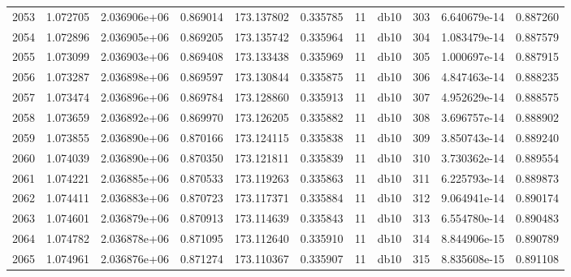 \begin{tabular}{lrrrrrrlrrr}
2053 &    1.072705 &        2.036906e+06 &  0.869014 &              173.137802 &    0.335785 &      11 &         db10 &    303 &   6.640679e-14 &      0.887260 \\
2054 &    1.072896 &        2.036905e+06 &  0.869205 &              173.135742 &    0.335964 &      11 &         db10 &    304 &   1.083479e-14 &      0.887579 \\
2055 &    1.073099 &        2.036903e+06 &  0.869408 &              173.133438 &    0.335969 &      11 &         db10 &    305 &   1.000697e-14 &      0.887915 \\
2056 &    1.073287 &        2.036898e+06 &  0.869597 &              173.130844 &    0.335875 &      11 &         db10 &    306 &   4.847463e-14 &      0.888235 \\
2057 &    1.073474 &        2.036896e+06 &  0.869784 &              173.128860 &    0.335913 &      11 &         db10 &    307 &   4.952629e-14 &      0.888575 \\
2058 &    1.073659 &        2.036892e+06 &  0.869970 &              173.126205 &    0.335882 &      11 &         db10 &    308 &   3.696757e-14 &      0.888902 \\
2059 &    1.073855 &        2.036890e+06 &  0.870166 &              173.124115 &    0.335838 &      11 &         db10 &    309 &   3.850743e-14 &      0.889240 \\
2060 &    1.074039 &        2.036890e+06 &  0.870350 &              173.121811 &    0.335839 &      11 &         db10 &    310 &   3.730362e-14 &      0.889554 \\
2061 &    1.074221 &        2.036885e+06 &  0.870533 &              173.119263 &    0.335863 &      11 &         db10 &    311 &   6.225793e-14 &      0.889873 \\
2062 &    1.074411 &        2.036883e+06 &  0.870723 &              173.117371 &    0.335884 &      11 &         db10 &    312 &   9.064941e-14 &      0.890174 \\
2063 &    1.074601 &        2.036879e+06 &  0.870913 &              173.114639 &    0.335843 &      11 &         db10 &    313 &   6.554780e-14 &      0.890483 \\
2064 &    1.074782 &        2.036878e+06 &  0.871095 &              173.112640 &    0.335910 &      11 &         db10 &    314 &   8.844906e-15 &      0.890789 \\
2065 &    1.074961 &        2.036876e+06 &  0.871274 &              173.110367 &    0.335907 &      11 &         db10 &    315 &   8.835608e-15 &      0.891108 \\

\end{tabular}
